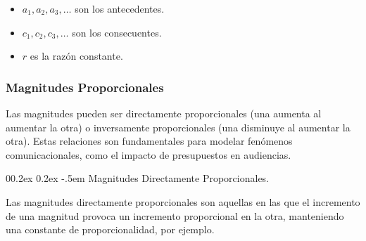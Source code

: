 \documentclass[
  stu,
  floatsintext,
  longtable,
  a4paper,
  nolmodern,
  notxfonts,
  notimes,
  colorlinks=true,linkcolor=blue,citecolor=blue,urlcolor=blue]{apa7}
\makeatletter
\renewcommand{\paragraph}{\@startsection{paragraph}{4}{\parindent}%
	{0\baselineskip \@plus 0.2ex \@minus 0.2ex}%
	{-.5em}%
	{\normalfont\normalsize\bfseries\typesectitle}}
\makeatother
\begin{document}
\begin{itemize}
\item
  \(a_1, a_2, a_3, \dots\) son los antecedentes.
\item
  \(c_1, c_2, c_3, \dots\) son los consecuentes.
\item
  \(r\) es la razón constante.
\end{itemize}

\subsubsection{Magnitudes
Proporcionales}\label{magnitudes-proporcionales}

Las magnitudes pueden ser directamente proporcionales (una aumenta al
aumentar la otra) o inversamente proporcionales (una disminuye al
aumentar la otra). Estas relaciones son fundamentales para modelar
fenómenos comunicacionales, como el impacto de presupuestos en
audiencias.

\paragraph{Magnitudes Directamente
Proporcionales.}\label{magnitudes-directamente-proporcionales}

Las magnitudes directamente proporcionales son aquellas en las que el
incremento de una magnitud provoca un incremento proporcional en la
otra, manteniendo una constante de proporcionalidad, por ejemplo.
\end{document}
